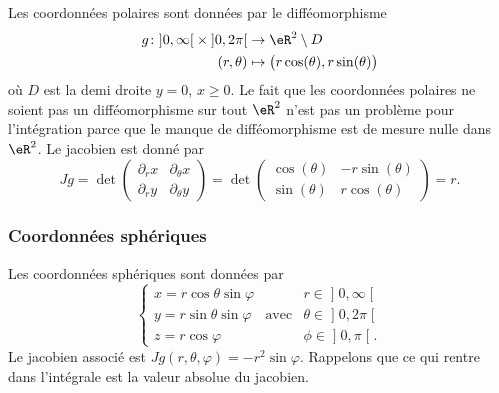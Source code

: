 Les coordonnées polaires sont données par le difféomorphisme
\begin{equation}
	\begin{aligned}
		g\colon \mathopen]0,\infty\mathclose[\times\mathopen]0,2\pi\mathclose[ &\to\eR^2\setminus D\\
		(r,\theta)&\mapsto \big( r\cos(\theta),r\sin(\theta) \big)
	\end{aligned}
\end{equation}
où $D$ est la demi droite $y=0$, $x\geq 0$. Le fait que les coordonnées polaires ne soient pas un difféomorphisme sur tout $\eR^2$ n'est pas un problème pour l'intégration parce que le manque de difféomorphisme est de mesure nulle dans $\eR^2$. Le jacobien est donné par
\begin{equation}
	Jg=\det\begin{pmatrix}
	\partial_rx	&	\partial_{\theta}x	\\ 
	\partial_ry	&	\partial_{\theta}y
\end{pmatrix}=\det\begin{pmatrix}
	\cos(\theta)	&	-r\sin(\theta)	\\ 
	\sin(\theta)	&	r\cos(\theta)	
\end{pmatrix}=r.
\end{equation}


					\subsubsection{Coordonnées sphériques}
\label{SubSubCoordSpJxhMwm}

Les coordonnées sphériques sont données par
\begin{equation}		\label{EqChmVarSpherique}
	\left\{
\begin{array}{lllll}
x=r\cos\theta\sin\varphi	&			&r\in\mathopen] 0 , \infty \mathclose[\\
y=r\sin\theta\sin\varphi	&	\text{avec}	&\theta\in\mathopen] 0 , 2\pi \mathclose[\\
z=r\cos\varphi			&			&\phi\in\mathopen] 0 , \pi \mathclose[.
\end{array}
\right.
\end{equation}
Le jacobien associé est $Jg(r,\theta,\varphi)=-r^2\sin\varphi$. Rappelons que ce qui rentre dans l'intégrale est la valeur absolue du jacobien.

